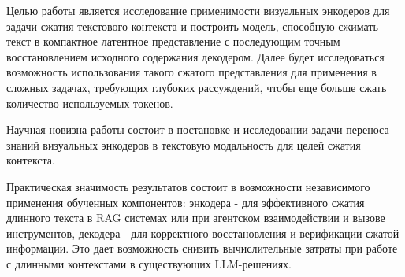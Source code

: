 \documentclass[a4paper,12pt]{extarticle}
\begin{document}
Целью работы является исследование применимости визуальных энкодеров для задачи сжатия текстового контекста и построить модель, способную сжимать текст в компактное латентное представление с последующим точным восстановлением исходного содержания декодером. Далее будет исследоваться возможность использования такого сжатого представления для применения в сложных задачах, требующих глубоких рассуждений, чтобы еще больше сжать количество используемых токенов.

Научная новизна работы состоит в постановке и исследовании задачи переноса знаний визуальных энкодеров в текстовую модальность для целей сжатия контекста.

Практическая значимость результатов состоит в возможности независимого применения обученных компонентов: энкодера - для эффективного сжатия длинного текста в RAG системах или при агентском взаимодействии и вызове инструментов, декодера - для корректного восстановления и верификации сжатой информации. Это дает возможность снизить вычислительные затраты при работе с длинными контекстами в существующих LLM-решениях. 



\end{document}

